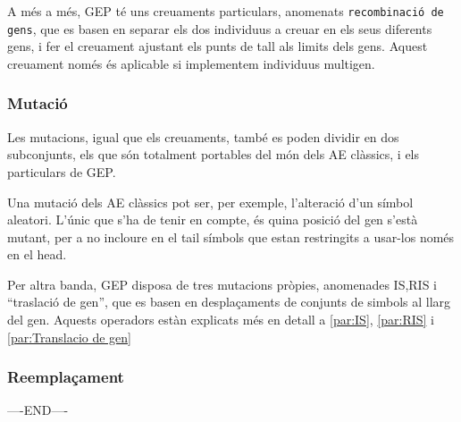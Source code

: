 \documentclass[titlepage,a4paper,12pt]{book}
\begin{document}
A més a més, GEP té uns creuaments particulars, anomenats \texttt{recombinació
de gens}, que es basen en separar els dos individuus a creuar en els seus
diferents gens, i fer el creuament ajustant els punts de tall als limits dels
gens.  Aquest creuament només és aplicable si implementem individuus multigen.

\subsubsection{Mutació} %
\label{ssub:Mutacio}
Les mutacions, igual que els creuaments, també es poden dividir en dos
subconjunts, els que són totalment portables del món dels AE clàssics, i els
particulars de GEP.

Una mutació dels AE clàssics pot ser, per exemple, l'alteració d'un símbol
aleatori.  L'únic que s'ha de tenir en compte, és quina posició del gen s'està
mutant, per a no incloure en el tail símbols que estan restringits a usar-los
només en el head.

Per altra banda, GEP disposa de tres mutacions pròpies, anomenades IS,RIS i
``traslació de gen'', que es basen en desplaçaments de conjunts de simbols al
llarg del gen.  Aquests operadors estàn explicats més en detall a \ref{par:IS},
\ref{par:RIS} i \ref{par:Translacio de gen}

\subsubsection{Reemplaçament} %
\label{ssub:Reemplacament}






----END----

\end{document}
